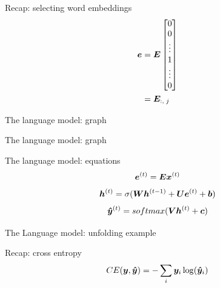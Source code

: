 \documentclass[10pt]{beamer}
\begin{document}
\begin{frame}{Recap: selecting word embeddings}
\Large{
\begin{align*}
  \bm{e} &= \bm{E}   \begin{bmatrix}
                         0\\
                         0\\
                         \vdots \\
                         1\\
                         \vdots \\
                         0
                         \end{bmatrix}\\         
			&= \bm{E}_{:,\;j}
\end{align*}
 }
\end{frame}


\begin{frame}{The language model: graph}

\end{frame}

\begin{frame}{The language model: graph}

\end{frame}



\begin{frame}{The language model: equations}
\Large{
 \vspace{0.2cm}
\begin{equation*}
\bm{e}^{(t)} = \bm{E}\bm{x}^{(t)}
\end{equation*}
\vspace{0.2cm}
 \begin{equation*}
\bm{h}^{(t)} = \sigma(\bm{W}\bm{h}^{(t-1)}+ \bm{U}\bm{e}^{(t)}+ \bm{b})
\end{equation*}
\vspace{0.2cm}
\begin{equation*}
\bm{\hat{y}}^{(t)} = softmax(\bm{V}\bm{h}^{(t)} + \bm{c})
\end{equation*}
}
\end{frame}


\begin{frame}{The Language model: unfolding example}

\end{frame}

\begin{frame}{Recap: cross entropy}
\Large{
\begin{equation*}
CE(\bm{y},\bm{\hat{y}}) = -\sum_{i}\bm{y}_{i}\log(\bm{\hat{y}}_{i})  
\end{equation*}
}
\end{frame}
\end{document}
